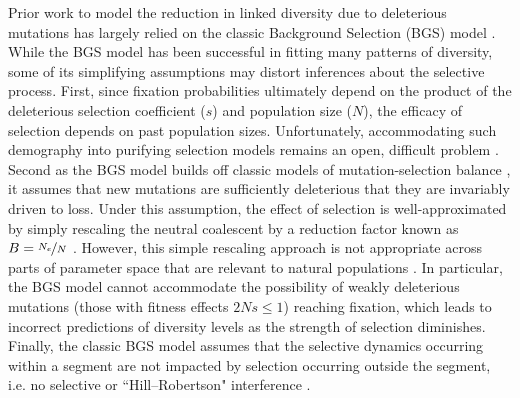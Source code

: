 \documentclass[11pt]{article}
\begin{document}
Prior work to model the reduction in linked diversity due to deleterious
mutations has largely relied on the classic Background Selection (BGS) model
\parencite{Charlesworth1993-gb,Nordborg1996-nq,Hudson1995-pt,Hudson1995-xc}.
While the BGS model has been successful in fitting many patterns of diversity,
some of its simplifying assumptions may distort inferences about the selective process. First, since fixation probabilities ultimately depend on the
product of the deleterious selection coefficient ($s$) and population size
($N$), the efficacy of selection depends on past population sizes.
Unfortunately, accommodating such demography into purifying selection models remains an open, difficult problem \parencite{Zeng2013-ep,Johri2020-oj}.
Second as the BGS model builds off classic models of mutation-selection balance
\parencite{Crow1970-wm,Kimura1966-bk}, it assumes that new mutations are sufficiently deleterious that they are invariably driven to loss. Under
this assumption, the effect of selection is well-approximated by simply
rescaling the neutral coalescent by a reduction factor known as $B =
\nicefrac{N_e}{N}$ \parencite{Charlesworth2013-kl}. However, this simple
rescaling approach is not appropriate across parts of parameter space that are
relevant to natural populations \parencite{McVean2000-bt,Good2014-yz}. In
particular, the BGS model cannot accommodate the possibility of weakly deleterious mutations (those with fitness effects $2Ns \le 1$) reaching fixation, which leads to incorrect
predictions of diversity levels as the strength of selection diminishes. 
Finally, the classic BGS
model assumes that the selective dynamics occurring within a segment are not impacted by selection occurring outside the segment, i.e. no selective or
``Hill--Robertson" interference
\parencite{Hill1966-kd,McVean2000-bt,Felsenstein1974-xm}.
\end{document}
